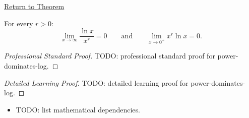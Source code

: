 \newpage
{}
\label{prf:power-dominates-log}

\begin{remark*}[Return]
\hyperref[prop:power-dominates-log]{Return to Theorem}
\end{remark*}

\begin{theorem*}
For every $r > 0$:
\[
  \lim_{x \to \infty} \frac{\ln x}{x^r} = 0
  \qquad\text{and}\qquad
  \lim_{x \to 0^+} x^r \ln x = 0.
\]

\smallskip\noindent
\end{theorem*}

\begin{proof}[Professional Standard Proof]
\LRAProofBodyStart
TODO: professional standard proof for power-dominates-log.
\end{proof}

\begin{proof}[Detailed Learning Proof]
\LRAProofBodyStart
TODO: detailed learning proof for power-dominates-log.
\end{proof}

\begin{remark*}
\end{remark*}

\begin{dependencies}
\begin{itemize}
  \item TODO: list mathematical dependencies.
\end{itemize}
\end{dependencies}

\clearpage
